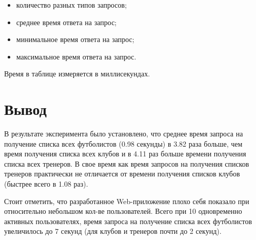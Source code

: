 \begin{itemize}
    \item количество разных типов запросов;
    \item среднее время ответа на запрос;
    \item минимальное время ответа на запрос;
    \item максимальное время ответа на запрос.
\end{itemize}

Время в таблице измеряется в миллисекундах.


\section{Вывод}

В результате эксперимента было установлено, что среднее время запроса на получение списка всех футболистов (0.98 секунды) в 3.82 раза больше, чем время получения списка всех клубов и в 4.11 раз больше времени получения списка всех тренеров. В свое время как время запросов на получения списков тренеров практически не отличается от времени получения списков клубов (быстрее всего в 1.08 раз). 

Стоит отметить, что разработанное Web-приложение плохо себя показало при относительно небольшом кол-ве пользователей. Всего при 10 одновременно активных пользователях, время запроса на получение списка всех футболистов увеличилось до 7 секунд (для клубов и тренеров почти до 2 секунд).
